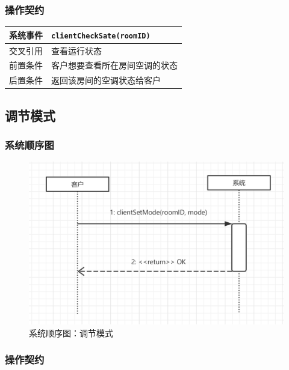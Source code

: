 \documentclass[black,normal,cn]{elegantnote}
\newcommand{\code}[1]{\colorbox{light-gray}{\texttt{#1}}}
\begin{document}
\subsubsection{操作契约}

\begin{center}
    \begin{tabular}{|>{\centering}m{}|m{}|}
        \hline
        系统事件   & \multicolumn{1}{l|}{\code{clientCheckSate(roomID)}} \\
        \hline
        交叉引用   & 查看运行状态                                        \\
        \hline
        前置条件   & 客户想要查看所在房间空调的状态                      \\
        \hline
        {后置条件} & 返回该房间的空调状态给客户                          \\
        \hline
    \end{tabular}
\end{center}

\subsection{调节模式}

\subsubsection{系统顺序图}

\begin{figure}[H]
    \centering
    \includegraphics[width=.8\textwidth]{fig/250004.png}
    \caption{系统顺序图：调节模式}
    \label{fig:250004}
\end{figure}

\subsubsection{操作契约}
\end{document}
